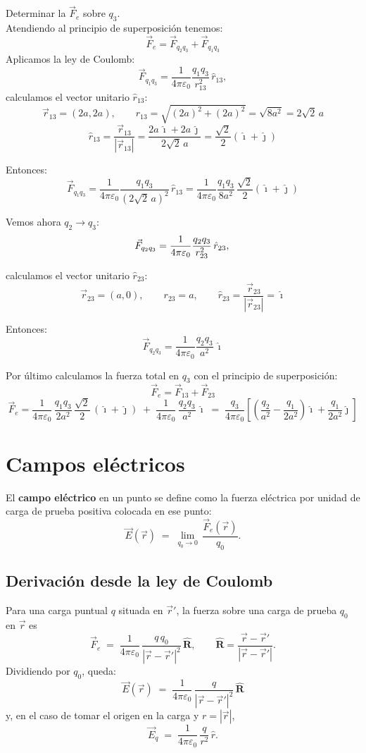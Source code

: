 \documentclass[a4paper,12pt]{article}
\begin{document}
Determinar la $\vec{F}_e$ sobre $q_3$. \\
Atendiendo al principio de superposición tenemos:
\[
\vec{F}_e = \vec{F}_{q_2 q_3} + \vec{F}_{q_1 q_3}
\]
Aplicamos la ley de Coulomb:
\[
\vec{F}_{q_1 q_3} = \frac{1}{4\pi \varepsilon_0} \frac{q_1 q_3}{r_{13}^2} \, \hat{r}_{13}, 
\]
calculamos el vector unitario $\hat{r}_{13}$:
\[
\vec{r}_{13} = (2a,2a), 
\qquad r_{13} = \sqrt{(2a)^2+(2a)^2} = \sqrt{8a^2} = 2\sqrt{2}\,a
\]
\[
\hat{r}_{13} = \frac{\vec{r}_{13}}{|\vec{r}_{13}|} = \frac{2a\,\hat{\imath} + 2a\,\hat{\jmath}}{2\sqrt{2}\,a} 
= \frac{\sqrt{2}}{2} (\hat{\imath} + \hat{\jmath})
\]

Entonces:
\[
\vec{F}_{q_1 q_3} = \frac{1}{4\pi \varepsilon_0} \frac{q_1 q_3}{(2\sqrt{2}\,a)^2} \, \hat{r}_{13}
= \frac{1}{4\pi \varepsilon_0} \frac{q_1 q_3}{8a^2} \, \frac{\sqrt{2}}{2} (\hat{\imath} + \hat{\jmath})
\]

Vemos ahora $q_2 \to q_3$:
\[
\vec{F}_{q_2 q_3} = \frac{1}{4\pi \varepsilon_0} \frac{q_2 q_3}{r_{23}^2} \, \hat{r}_{23}, \\
\]

calculamos el vector unitario $\hat{r}_{23}$:
\[
\vec{r}_{23} = (a,0), \qquad r_{23}=a, \qquad \hat{r}_{23} = \frac{\vec{r}_{23}}{|\vec{r}_{23}|} = \hat{\imath}
\]

Entonces:
\[
\vec{F}_{q_2 q_3} = \frac{1}{4\pi \varepsilon_0} \frac{q_2 q_3}{a^2} \, \hat{\imath}
\]

Por último calculamos la fuerza total en $q_3$ con el principio de superposición:
\[
\vec{F}_e = \vec{F}_{13} + \vec{F}_{23}
\]
\[
\vec{F}_e =
\frac{1}{4\pi\varepsilon_0}\,\frac{q_1 q_3}{2a^2}\,\frac{\sqrt{2}}{2}\,(\hat{\imath}+\hat{\jmath})
\;+\;
\frac{1}{4\pi\varepsilon_0}\,\frac{q_2 q_3}{a^2}\,\hat{\imath}
\;=\;
\frac{q_3}{4\pi\varepsilon_0}\!\left[
\left(\frac{q_2}{a^2}-\frac{q_1}{2a^2}\right)\hat{\imath}
+\frac{q_1}{2a^2}\hat{\jmath}
\right]
\]

\newpage

\section{Campos eléctricos}

El \textbf{campo eléctrico} en un punto se define como la fuerza eléctrica por unidad de carga de prueba positiva colocada en ese punto:
\[
\vec E(\vec r) \;=\; \lim_{q_0 \to 0}\,\frac{\vec F_e(\vec r)}{q_0}.
\]

\subsection*{Derivación desde la ley de Coulomb}
Para una carga puntual $q$ situada en $\vec r'$, la fuerza sobre una carga de prueba $q_0$ en $\vec r$ es
\[
\vec F_e \;=\; \frac{1}{4\pi\varepsilon_0}\,\frac{q\,q_0}{|\vec r-\vec r'|^2}\,\hat{\mathbf R},
\qquad \hat{\mathbf R}=\frac{\vec r-\vec r'}{|\vec r-\vec r'|}.
\]
Dividiendo por $q_0$, queda:
\[
\boxed{\;\vec E(\vec r)\;=\;\frac{1}{4\pi\varepsilon_0}\,\frac{q}{|\vec r-\vec r'|^2}\,\hat{\mathbf R}\;}
\]
y, en el caso de tomar el origen en la carga y $r=|\vec r|$,
\[
\vec E_q \;=\; \frac{1}{4\pi\varepsilon_0}\,\frac{q}{r^2}\,\hat r .
\]
\end{document}
